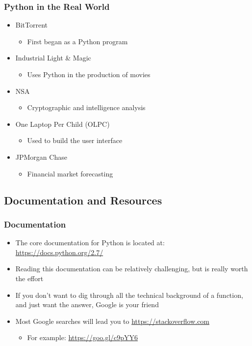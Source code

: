 \documentclass[mini frame in current subsection]{beamer}
\begin{document}
		\begin{frame}
			\frametitle{Python in the Real World}
			\begin{itemize}
				\vfill \item  BitTorrent
					\begin{itemize}
						\item  First began as a Python program
					\end{itemize}
				\vfill \item  Industrial Light \& Magic
					\begin{itemize}
						\item  Uses Python in the production of movies
					\end{itemize}
				\vfill \item  NSA
					\begin{itemize}
						\item  Cryptographic and intelligence analysis
					\end{itemize}
				\vfill \item  One Laptop Per Child (OLPC)
					\begin{itemize}
						\item  Used to build the user interface
					\end{itemize}
				\vfill \item  JPMorgan Chase
					\begin{itemize}
						\item  Financial market forecasting
					\end{itemize}
			\end{itemize}
		\end{frame}
		
	\subsection{Documentation and Resources}
	
		\begin{frame}
			\frametitle{Documentation}
			\begin{itemize}
				\vfill \item  The core documentation for Python is located at: \url{https://docs.python.org/2.7/}
				\vfill \item  Reading this documentation can be relatively challenging, but is really worth the effort
				\vfill \item  If you don't want to dig through all the technical background of a function, and just want the answer, Google is your friend
				\vfill \item  Most Google searches will lead you to \url{https://stackoverflow.com}
					\begin{itemize}
						\item  For example:  \url{https://goo.gl/c9pYY6}
					\end{itemize}
			\end{itemize}
		\end{frame}
	
\end{document}
